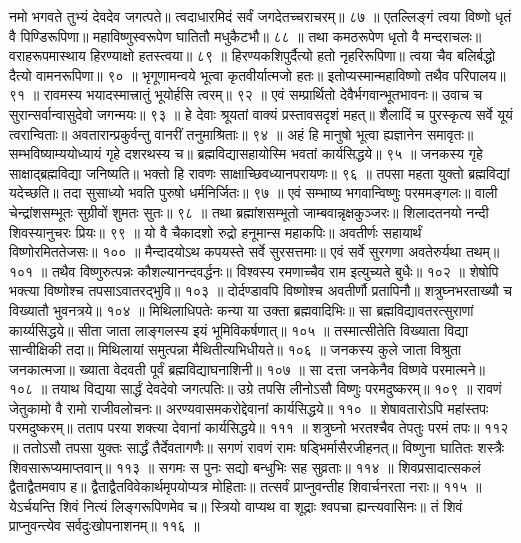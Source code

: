 नमो भगवते तुभ्यं देवदेव जगत्पते॥
त्वदाधारमिदं सर्वं जगदेतच्चराचरम्॥ ८७ ॥
एतल्लिङ्गं त्वया विष्णो धृतं वै पिण्डिरूपिणा॥
महाविष्णुस्वरूपेण घातितौ मधुकैटभौ॥ ८८ ॥
तथा कमठरूपेण धृतो वै मन्दराचलः॥
वराहरूपमास्थाय हिरण्याक्षो हतस्त्वया॥ ८९ ॥
हिरण्यकशिपुर्दैत्यो हतो नृहरिरूपिणा॥
त्वया चैव बलिर्बद्धो दैत्यो वामनरूपिणा॥ ९० ॥
भृगूणामन्वये भूत्वा कृतवीर्यात्मजो हतः॥
इतोप्यस्मान्महाविष्णो तथैव परिपालय॥ ९१ ॥
रावमस्य भयादस्मात्त्रातुं भूयोर्हसि त्वरम्॥ ९२ ॥
एवं सम्प्रार्थितो देवैर्भगवान्भूतभावनः॥
उवाच च सुरान्सर्वान्वासुदेवो जगन्मयः॥ ९३ ॥
हे देवाः श्रूयतां वाक्यं प्रस्तावसदृशं महत्॥
शैलादिं च पुरस्कृत्य सर्वे यूयं त्वरान्विताः॥
अवतारान्प्रकुर्वन्तु वानरीं तनुमाश्रिताः॥ ९४ ॥
अहं हि मानुषो भूत्वा ह्यज्ञानेन समावृतः॥
सम्भविष्याम्ययोध्यायं गृहे दशरथस्य च॥
ब्रह्मविद्यासहायोस्मि भवतां कार्यसिद्धये॥ ९५ ॥
जनकस्य गृहे साक्षाद्ब्रह्मविद्या जनिष्यति॥
भक्तो हि रावणः साक्षाच्छिवध्यानपरायणः॥ ९६ ॥
तपसा महता युक्तो ब्रह्मविद्यां यदेच्छति॥
तदा सुसाध्यो भवति पुरुषो धर्मनिर्जितः॥ ९७ ॥
एवं सम्भाष्य भगवान्विष्णुः परममङ्गलः॥
वाली चेन्द्रांशसम्भूतः सुग्रीवों शुमतः सुतः॥ ९८ ॥
तथा ब्रह्मांशसम्भूतो जाम्बवान्नृक्षकुञ्जरः॥
शिलादतनयो नन्दी शिवस्यानुचरः प्रियः॥ ९९ ॥
यो वै चैकादशो रुद्रो हनूमान्स महाकपिः॥
अवतीर्णः सहायार्थं विष्णोरमिततेजसः॥ १०० ॥
मैन्दादयोऽथ कपयस्ते सर्वे सुरसत्तमाः॥
एवं सर्वे सुरगणा अवतेरुर्यथा तथम्॥ १०१ ॥
तथैव विष्णुरुत्पन्नः कौशल्यानन्दवर्द्धनः॥
विश्वस्य रमणाच्चैव राम इत्युच्यते बुधैः॥ १०२ ॥
शेषोपि भक्त्या विष्णोश्च तपसाऽवातरद्भुवि॥ १०३ ॥
दोर्दण्डावपि विष्णोश्च अवतीर्णौ प्रतापिनौ॥
शत्रुघ्नभरताख्यौ च विख्यातौ भुवनत्रये॥ १०४ ॥
मिथिलाधिपतेः कन्या या उक्ता ब्रह्मवादिभिः॥
सा ब्रह्मविद्यावतरत्सुराणां कार्य्यसिद्धये॥
सीता जाता लाङ्गलस्य इयं भूमिविकर्षणात्॥ १०५ ॥
तस्मात्सीतेति विख्याता विद्या सान्वीक्षिकी तदा॥
मिथिलायां समुत्पन्ना मैथितीत्यभिधीयते॥ १०६ ॥
जनकस्य कुले जाता विश्रुता जनकात्मजा॥
ख्याता वेदवती पूर्वं ब्रह्मविद्याघनाशिनी॥ १०७ ॥
सा दत्ता जनकेनैव विष्णवे परमात्मने॥ १०८ ॥
तयाथ विद्यया सार्द्धं देवदेवो जगत्पतिः॥
उग्रे तपसि लीनोऽसौ विष्णुः परमदुष्करम्॥ १०९ ॥
रावणं जेतुकामो वै रामो राजीवलोचनः॥
अरण्यवासमकरोद्देवानां कार्यसिद्धये॥ ११० ॥
शेषावतारोऽपि महांस्तपः परमदुष्करम्॥
तताप परया शक्त्या देवानां कार्यसिद्धये॥ १११ ॥
शत्रुघ्नो भरतश्चैव तेपतुः परमं तपः॥ ११२ ॥
ततोऽसौ तपसा युक्तः सार्द्धं तैर्देवतागणैः॥
सगणं रावणं रामः षड्भिर्मासैरजीहनत्॥
विष्णुना घातितः शस्त्रैः शिवसारूप्यमाप्तवान्॥ ११३ ॥
सगमः स पुनः सद्यो बन्धुभिः सह सुव्रताः॥ ११४ ॥
शिवप्रसादात्सकलं द्वैताद्वैतमवाप ह॥
द्वैताद्वैतविवेकार्थमृपयोप्यत्र मोहिताः॥
तत्सर्वं प्राप्नुवन्तीह शिवार्चनरता नराः॥ ११५ ॥
येऽर्चयन्ति शिवं नित्यं लिङ्गरूपिणमेव च॥
स्त्रियो वाप्यथ वा शूद्राः श्वपचा ह्यन्त्यवासिनः॥
तं शिवं प्राप्नुवन्त्येव सर्वदुःखोपनाशनम्॥ ११६ ॥
